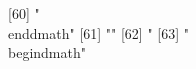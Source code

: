  [60] "\\end{dmath}"                                                                                                                                                                                                                                                                                                                                                                                                                                                                                
 [61] ""                                                                                                                                                                                                                                                                                                                                                                                                                                                                                            
 [62] "%
 [63] "\\begin{dmath}"                                                                                                                                                                                                                                                                                                                                                                                                                                                                              
